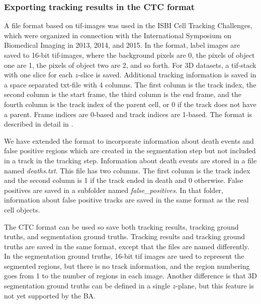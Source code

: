 \documentclass[a4paper, oneside, onecolumn, 11pt]{article}
\newcommand{\file}[1]{\emph{#1}}
\begin{document}
\subsubsection{Exporting tracking results in the CTC format}
\label{sec:CTC-format}
A file format based on tif-images was used in the ISBI Cell Tracking Challenges, which were organized in connection with the International Symposium on Biomedical Imaging in 2013, 2014, and 2015. In the format, label images are saved to 16-bit tif-images, where the background pixels are 0, the pixels of object one are 1, the pixels of object two are 2, and so forth. For 3D datasets, a tif-stack with one slice for each $z$-slice is saved. Additional tracking information is saved in a space separated txt-file with 4 columns. The first column is the track index, the second column is the start frame, the third column is the end frame, and the fourth column is the track index of the parent cell, or 0 if the track does not have a parent. Frame indices are 0-based and track indices are 1-based. The format is described in detail in \cite{Maska14Benchmark, Ortiz15Challenge, Ulman17Objective}.

We have extended the format to incorporate information about death events and false positive regions which are created in the segmentation step but not included in a track in the tracking step. Information about death events are stored in a file named \file{deaths.txt}. This file has two columns. The first column is the track index and the second column is 1 if the track ended in death and 0 otherwise. False positives are saved in a subfolder named \file{false\_positives}. In that folder, information about false positive tracks are saved in the same format as the real cell objects.

The CTC format can be used so save both tracking results, tracking ground truths, and segmentation ground truths. Tracking results and tracking ground truths are saved in the same format, except that the files are named differently. In the segmentation ground truths, 16-bit tif images are used to represent the segmented regions, but there is no track information, and the region numbering goes from 1 to the number of regions in each image. Another difference is that 3D segmentation ground truths can be defined in a single $z$-plane, but this feature is not yet supported by the BA.
\end{document}
